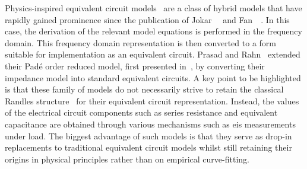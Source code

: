 Physics-inspired                        equivalent                       circuit
models~\cite{Prasad2012,Prasad2014,Zhang2017,Cheng2017,Merla2018} are a class of
hybrid  models that  have rapidly  gained  prominence since  the publication  of
Jokar~\etal~\cite{Jokar2016}  and Fan~\etal~\cite{Fan2015}.  In  this case,  the
derivation of the relevant model equations is performed in the frequency domain.
This frequency  domain representation is then  converted to a form  suitable for
implementation  as  an  equivalent circuit.  Prasad  and  Rahn~\cite{Prasad2014}
extended their Padé order  reduced model, first presented in~\cite{Prasad2013},
by converting  their impedance  model into standard  equivalent circuits.  A key
point  to be  highlighted is  that  these family  of models  do not  necessarily
strive to  retain the  classical Randles structure~\cite{Randles1947}  for their
equivalent circuit representation. Instead, the values of the electrical circuit
components such  as series  resistance and  equivalent capacitance  are obtained
through  various  mechanisms such  as  \gls{eis}  measurements under  load.  The
biggest advantage of  such models is that they serve  as drop-in replacements to
traditional equivalent  circuit models whilst  still retaining their  origins in
physical principles rather than on empirical curve-fitting.







